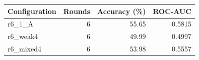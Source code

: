 \begin{tabular}{lrrr}
Configuration & Rounds & Accuracy (\%) & ROC-AUC \\
\hline
r6\_1\_A & 6 & 55.65 & 0.5815 \\
r6\_weak4 & 6 & 49.99 & 0.4997 \\
r6\_mixed4 & 6 & 53.98 & 0.5557 \\
\end{tabular}
